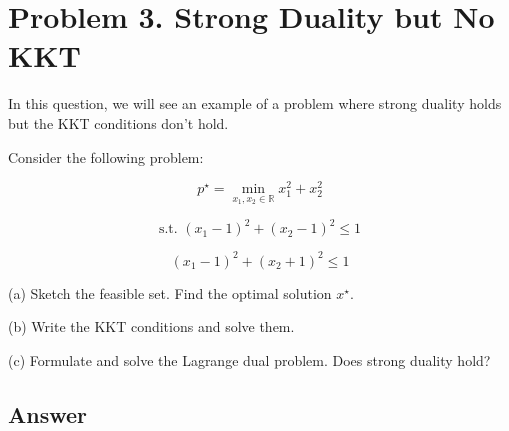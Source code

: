 \documentclass[
	12pt,
]{fphw}
\begin{document}
\newpage
\section*{Problem 3. Strong Duality but No KKT}

In this question, we will see an example of a problem where strong duality holds but the KKT conditions don’t hold.

Consider the following problem:

\[
p^\star = \min_{x_1,x_2 \in \mathbb{R}} x_1^2 + x_2^2
\tag{14}
\]

\[
\text{s.t. } (x_1 - 1)^2 + (x_2 - 1)^2 \le 1
\tag{15}
\]

\[
(x_1 - 1)^2 + (x_2 + 1)^2 \le 1
\tag{16}
\]

(a) Sketch the feasible set.
Find the optimal solution \(x^\star\).

(b) Write the KKT conditions and solve them.

(c) Formulate and solve the Lagrange dual problem.
Does strong duality hold?

\subsection*{Answer}
\end{document}
